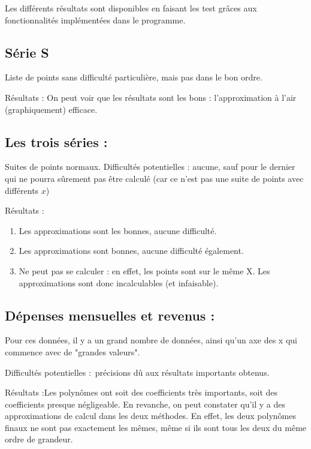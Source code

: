 \documentclass[letter]{article}
\begin{document}
Les différents résultats sont disponibles en faisant les test grâces aux fonctionnalités implémentées dans le programme.


\subsection{Série S}
\label{sec:orga13e5d9}

Liste de points sans difficulté particulière, mais pas dans le bon ordre.

Résultats : On peut voir que les résultats sont les bons : l'approximation à l'air (graphiquement) efficace.



\subsection{Les trois séries :}
\label{sec:org4852285}

Suites de points normaux.
Difficultés potentielles : aucune, sauf pour le dernier qui ne pourra sûrement pas être calculé (car ce n'est pas une suite de points avec différents \(x\))


Résultats : 

\begin{enumerate}
\item Les approximations sont les bonnes, aucune difficulté.

\item Les approximations sont bonnes, aucune difficulté également.

\item Ne peut pas se calculer : en effet, les points sont sur le même X. Les approximations sont donc incalculables (et infaisable).
\end{enumerate}


\subsection{Dépenses mensuelles et revenus :}
\label{sec:orgedc362c}

Pour ces données, il y a un grand nombre de données, ainsi qu'un axe des x qui commence avec de "grandes valeurs".

Difficultés potentielles : précisions dû aux résultats importants obtenus.


Résultats :Les polynômes ont soit des coefficients très importants, soit des coefficients presque négligeable. En revanche, on peut constater qu'il y a des approximations de calcul dans les deux méthodes. En effet, les deux polynômes finaux ne sont pas exactement les mêmes, même si ils sont tous les deux du même ordre de grandeur.
\end{document}
